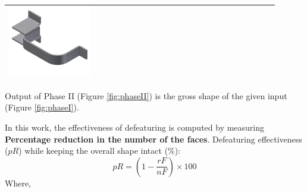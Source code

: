 \begin{minipage}[t]{0.9\linewidth}
\begin{tabular}[h]{@{} p{0.3\linewidth}| p{0.3\linewidth}|  p{0.3\linewidth}@{}}
\includegraphics[width=0.98\linewidth]{..//Common/images/DefeatBracketPhase_II_3} \\ \bottomrule

\end{tabular}
\label{fig:phaseII}
\end{minipage}

Output of Phase II (Figure  \ref{fig:phaseII}) is the gross shape of the given input (Figure  \ref{fig:phaseI}). 

In this work, the effectiveness of defeaturing is computed by measuring {\bf Percentage reduction in the number of the faces}. Defeaturing effectiveness ($pR$) while keeping the overall shape intact (\%):
	\begin{equation}\label{eqn:defeaturing:effectiveness}  pR = (1 - \frac{rF}{nF}) \times 100\end{equation}
	Where, 


